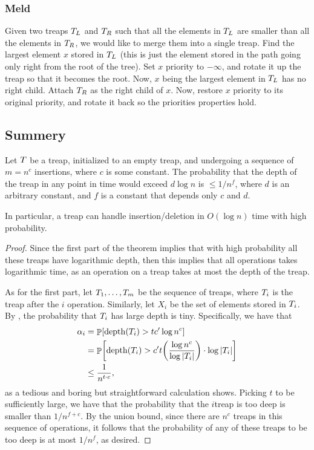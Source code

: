 \subsubsection{Meld}

Given two treaps $T_{L}$ and $T_R$ such that all the elements
in $T_L$ are smaller than all the elements in $T_R$, we would
like to merge them into a single treap. Find the largest element $x$
stored in $T_L$ (this is just the element stored in the path going
only right from the root of the tree). Set $x$ priority to $-\infty$,
and rotate it up the treap so that it becomes the root. Now, $x$ being
the largest element in $T_L$ has no right child. Attach $T_R$
as the right child of $x$. Now, restore $x$ priority to its original
priority, and rotate it back so the priorities properties hold.

\subsection{Summery}

\begin{theorem}
    Let $T$ be a treap, initialized to an empty treap, and
    undergoing a sequence of $m=n^{c}$ insertions, where $c$ is some
    constant.  The probability that the depth of the treap in any
    point in time would exceed $d\log n$ is $\leq1/n^{f}$, where $d$
    is an arbitrary constant, and $f$ is a constant that depends only
    $c$ and $d$.
    
    In particular, a treap can handle insertion/deletion in
    $O(\log n)$ time with high probability.
\end{theorem}
\begin{proof}
    Since the first part of the theorem implies that with high
    probability all these treaps have logarithmic depth, then this
    implies that all operations takes logarithmic time, as an
    operation on a treap takes at most the depth of the treap.

    As for the first part, let $T_{1},\ldots,T_{m}$ be the
    sequence of treaps, where $T_i$ is the treap after the $i$\th
    operation. Similarly, let $X_i$ be the set of elements stored in
    $T_i$.  By , the probability that
    $T_i$ has large depth is tiny. Specifically, we have that
    \begin{align*}
        \alpha_i &= \Prob{\MakeBig \mathrm{depth}\pth{\Tree_i} > t c'
           \log n^c }
        \\&=
        \Prob{\mathrm{depth}\pth{\Tree_i} > c' t \pth{\frac{\log n^c}{
                 \log \cardin{\Tree_i}}} \cdot \log \cardin{\Tree_i} }
        \\&\leq
        \frac{1}{n^{t \cdot c}},
    \end{align*}
    as a tedious and boring but straightforward calculation
    shows. Picking $t$ to be sufficiently large, we have that the
    probability that the $i$\th treap is too deep is smaller than
    $1/n^{f + c}$. By the union bound, since there are $n^c$ treaps in
    this sequence of operations, it follows that the probability of
    any of these treaps to be too deep is at most $1/n^f$, as desired.
\end{proof}


